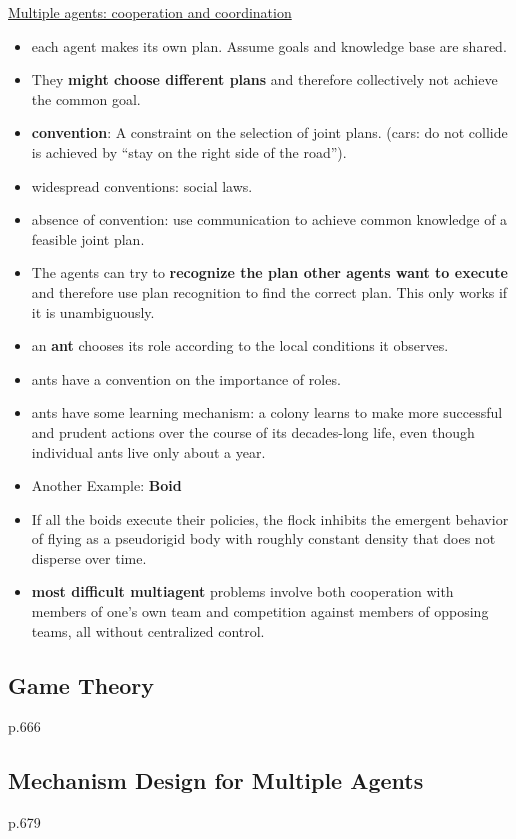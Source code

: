\underline{Multiple agents: cooperation and coordination }
\begin{itemize}[noitemsep,nolistsep]
	\item each agent makes its own plan. Assume goals and knowledge base are shared.
	\item They \textbf{might choose different plans} and therefore collectively not achieve the common goal.
	\item \textbf{convention}: A constraint on the selection of joint plans. (cars: do not collide is achieved by “stay on the right side of the road”).
	\item widespread conventions: social laws.
	\item absence of convention: use communication to achieve common knowledge of a feasible joint plan.
	\item The agents can try to \textbf{recognize the plan other agents want to execute} and therefore use plan recognition to find the correct plan. This only works if it is unambiguously.
	\item an \textbf{ant} chooses its role according to the local conditions it observes.
	\item ants have a convention on the importance of roles.
	\item ants have some learning mechanism: a colony learns to make more successful and prudent actions over the course of its decades-long life, even though individual ants live only about a year.
	\item Another Example: \textbf{Boid}
	\item If all the boids execute their policies, the flock inhibits the emergent behavior of flying as a pseudorigid body with roughly constant density that does not disperse over time.
	\item \textbf{most difficult multiagent} problems involve both cooperation with members of one’s own team and competition against members of opposing teams, all without centralized control.
\end{itemize}

\subsection{Game Theory}
p.666

\subsection{Mechanism Design for Multiple Agents}
p.679


